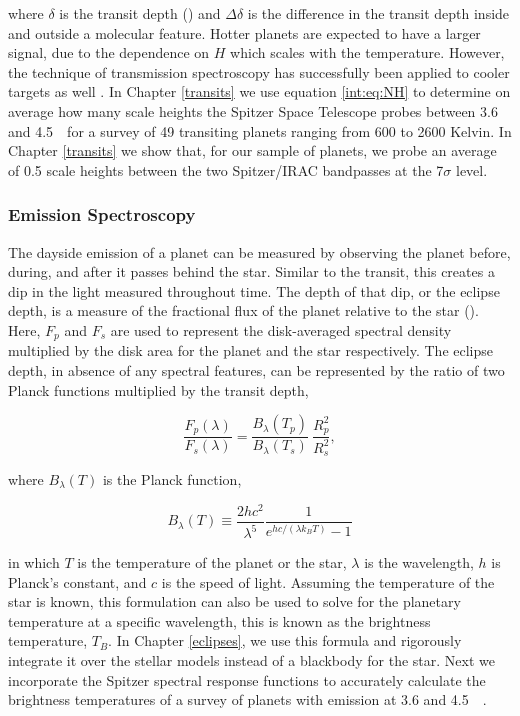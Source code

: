 where $\delta$ is the transit depth (\rprss) and $\Delta\delta$ is the difference in the transit depth inside and outside a molecular feature. Hotter planets are expected to have a larger signal, due to the dependence on $H$ which scales with the temperature. However, the technique of transmission spectroscopy has successfully been applied to cooler targets as well \citep[e.g.,][]{Desert2011b, Berta2012, Crossfield2017}. In Chapter \ref{transits} we use equation \ref{int:eq:NH} to determine on average how many scale heights the Spitzer Space Telescope probes between 3.6 and 4.5~\um~for a survey of 49 transiting planets ranging from 600 to 2600 Kelvin. %
In Chapter \ref{transits} we show that, for our sample of planets, we probe an average of 0.5 scale heights between the two Spitzer/IRAC bandpasses at the 7$\sigma$ level.

\subsubsection{Emission Spectroscopy}

The dayside emission of a planet can be measured by observing the planet before, during, and after it passes behind the star. Similar to the transit, this creates a dip in the light measured throughout time. The depth of that dip, or the eclipse depth, is a measure of the fractional flux of the planet relative to the star (\fpfs). Here, $F_p$ and $F_s$ are used to represent the disk-averaged spectral density multiplied by the disk area for the planet and the star respectively. The eclipse depth, in absence of any spectral features, can be represented by the ratio of two Planck functions multiplied by the transit depth,

\begin{equation}
\frac{F_p(\lambda)}{F_s(\lambda)} = \frac{B_\lambda(T_p)}{B_\lambda(T_s)}~\frac{R_p^2}{R_s^2},
\end{equation}

where $B_\lambda(T)$ is the Planck function,

\begin{equation}
B_\lambda(T) \equiv \frac{2hc^2}{\lambda^5} \frac{1}{e^{hc/(\lambda k_B T)} - 1}
\end{equation}

in which $T$ is the temperature of the planet or the star, $\lambda$ is the wavelength, $h$ is Planck's constant, and $c$ is the speed of light. Assuming the temperature of the star is known, this formulation can also be used to solve for the planetary temperature at a specific wavelength, this is known as the brightness temperature, $T_B$. In Chapter \ref{eclipses}, we use this formula and rigorously integrate it over the stellar models instead of a blackbody for the star. Next we incorporate the Spitzer spectral response functions to accurately calculate the brightness temperatures of a survey of planets with emission at 3.6 and 4.5~\um~.

